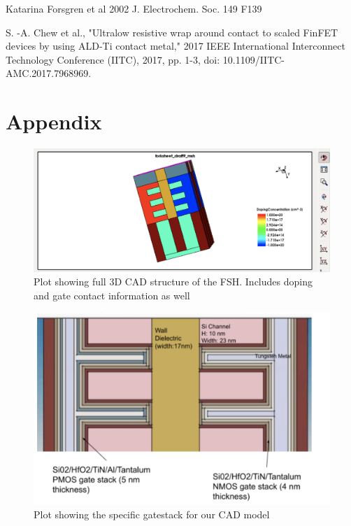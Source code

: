 \documentclass[letterpaper, 12 pt, conference]{ieeeconf}  %
\begin{document}
\begin{thebibliography}{99}
 Katarina Forsgren et al 2002 J. Electrochem. Soc. 149 F139


 S. -A. Chew et al., "Ultralow resistive wrap around contact to scaled FinFET devices by using ALD-Ti contact metal," 2017 IEEE International Interconnect Technology Conference (IITC), 2017, pp. 1-3, doi: 10.1109/IITC-AMC.2017.7968969.


\end{thebibliography}

\newpage
\section{Appendix}

\begin{figure}[H]
    \centering
    \includegraphics[width=.9\linewidth]{Screen Shot 2022-02-26 at 3.13.29 PM.png}
    \caption{Plot showing full 3D CAD structure of the FSH. Includes doping and gate contact information as well}
    \label{fig:knngraph1}
\end{figure}

\begin{figure}[H]
    \centering
    \includegraphics[width=.9\linewidth]{Screen Shot 2022-02-26 at 9.27.22 PM.png}
    \caption{Plot showing the specific gatestack for our CAD model \cite{c5}}
    \label{fig:knngraph1}
\end{figure}
\end{document}
